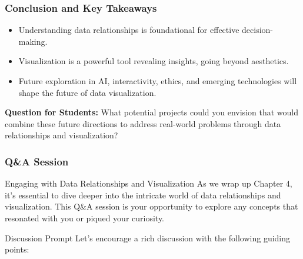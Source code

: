 \documentclass[aspectratio=169]{beamer}
\begin{document}
\begin{frame}[fragile]
    \frametitle{Conclusion and Key Takeaways}
    
    \begin{itemize}
        \item Understanding data relationships is foundational for effective decision-making.
        \item Visualization is a powerful tool revealing insights, going beyond aesthetics.
        \item Future exploration in AI, interactivity, ethics, and emerging technologies will shape the future of data visualization.
    \end{itemize}
    
    \textbf{Question for Students:} What potential projects could you envision that would combine these future directions to address real-world problems through data relationships and visualization?
\end{frame}

\begin{frame}[fragile]
    \frametitle{Q\&A Session}
    \begin{block}{Engaging with Data Relationships and Visualization}
        As we wrap up Chapter 4, it’s essential to dive deeper into the intricate world of data relationships and visualization. This Q\&A session is your opportunity to explore any concepts that resonated with you or piqued your curiosity.
    \end{block}
    \begin{block}{Discussion Prompt}
        Let's encourage a rich discussion with the following guiding points:
    \end{block}
\end{frame}
\end{document}
